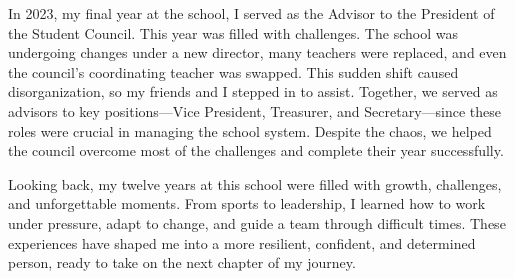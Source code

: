 \documentclass[11pt]{book}
\begin{document}
In 2023, my final year at the school, I served as the Advisor to the President of the Student Council. This year was filled with challenges. The school was undergoing changes under a new director, many teachers were replaced, and even the council’s coordinating teacher was swapped. This sudden shift caused disorganization, so my friends and I stepped in to assist. Together, we served as advisors to key positions—Vice President, Treasurer, and Secretary—since these roles were crucial in managing the school system. Despite the chaos, we helped the council overcome most of the challenges and complete their year successfully.

Looking back, my twelve years at this school were filled with growth, challenges, and unforgettable moments. From sports to leadership, I learned how to work under pressure, adapt to change, and guide a team through difficult times. These experiences have shaped me into a more resilient, confident, and determined person, ready to take on the next chapter of my journey.

\end{document}
